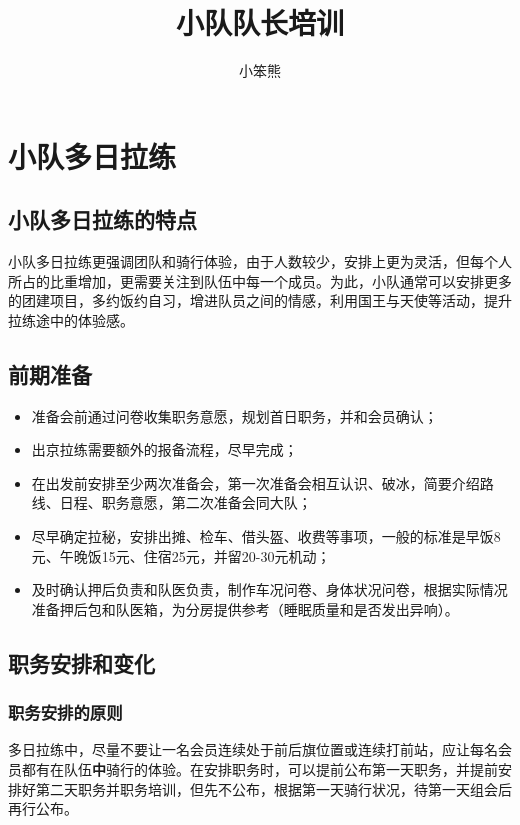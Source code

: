 \documentclass[UTF8]{ctexart}
\title{小队队长培训}
\author{小笨熊}
\begin{document}
\maketitle

\tableofcontents

\clearpage
\section{小队多日拉练}

\subsection{小队多日拉练的特点}

小队多日拉练更强调团队和骑行体验，由于人数较少，安排上更为灵活，但每个人所占的比重增加，更需要关注到队伍中每一个成员。为此，小队通常可以安排更多的团建项目，多约饭约自习，增进队员之间的情感，利用国王与天使等活动，提升拉练途中的体验感。

\subsection{前期准备}

\begin{itemize}[nosep,left=2em]
    \item 准备会前通过问卷收集职务意愿，规划首日职务，并和会员确认；
    \item 出京拉练需要额外的报备流程，尽早完成；
    \item 在出发前安排至少两次准备会，第一次准备会相互认识、破冰，简要介绍路线、日程、职务意愿，第二次准备会同大队；
    \item 尽早确定拉秘，安排出摊、检车、借头盔、收费等事项，一般的标准是早饭8元、午晚饭15元、住宿25元，并留20-30元机动；
    \item 及时确认押后负责和队医负责，制作车况问卷、身体状况问卷，根据实际情况准备押后包和队医箱，为分房提供参考（睡眠质量和是否发出异响）。
\end{itemize}

\subsection{职务安排和变化}

\subsubsection{职务安排的原则}

多日拉练中，尽量不要让一名会员连续处于前后旗位置或连续打前站，应让每名会员都有在队伍\textbf{中}骑行的体验。在安排职务时，可以提前公布第一天职务，并提前安排好第二天职务并职务培训，但先不公布，根据第一天骑行状况，待第一天组会后再行公布。
\end{document}
